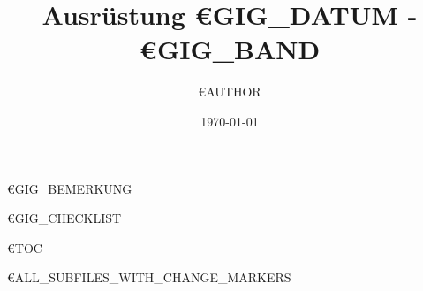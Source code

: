 \documentclass{article}
\title{Ausrüstung €{GIG_DATUM} - €{GIG_BAND}}
\author{€{AUTHOR}}
\date{\today}
\begin{document}
\maketitle

€{GIG_BEMERKUNG}

€{GIG_CHECKLIST}

€{TOC}
\pagebreak


€{ALL_SUBFILES_WITH_CHANGE_MARKERS}
\end{document}
